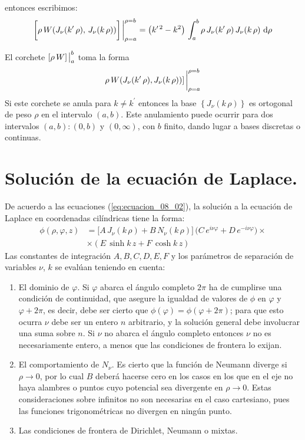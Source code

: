 entonces escribimos:
\begin{align}
\bigg[ \rho \, W(J_{\nu}(\ptilde{k} \, \rho), \, J_{\nu} (k \, \rho)) \bigg]\eval_{\rho=a}^{\rho=b} = \big( k^{\prime \, 2} - k^{2} \big) \, \int_{a}^{b} \rho \, J_{\nu}(\ptilde{k} \, \rho) \, J_{\nu} (k \, \rho) \, \dd{\rho}
\label{eq:ecuacion_08_12}
\end{align}

El corchete $[\rho \, W]\eval_{a}^{b}$ toma la forma
\begin{align*}
\rho \, W(J_{\nu}(k^{\prime} \, \rho), J_{\nu} (k \, \rho))]\eval_{\rho=a}^{\rho=b}
\end{align*}
Si este corchete se anula para $k \neq k^{\prime}$ entonces la base $\left\{ J_{\nu} (k \, \rho) \right\}$ es ortogonal de peso $\rho$ en el intervalo $(a,b)$. Este anulamiento puede ocurrir para dos intervalos $(a,b): (0, b)$ y $(0, \infty)$, con $b$ finito, dando lugar a bases discretas o continuas.
\section{Solución de la ecuación de Laplace.}
De acuerdo a las ecuaciones (\ref{eq:ecuacion_08_02}), la solución a la ecuación de Laplace en coordenadas cilíndricas tiene la forma:
\begin{align*}
\phi (\rho, \varphi, z) &= \big[ A \, J_{\nu} (k \, \rho) + B \, N_{\nu} (k \, \rho) \big] \, (C \, e^{i \nu \varphi} + D \, e^{-i \nu \varphi} \big) \times \\[0.5em]
&\times (E \, \sinh k \, z + F \,  \cosh k \, z)  \end{align*}
Las constantes de integración $A, B, C, D, E, F$ y los parámetros de separación de variables $\nu$, $k$ se evalúan teniendo en cuenta:
\begin{enumerate}[label=\textbf{\Alph*})]
\item El dominio de $\varphi$. Si $\varphi$ abarca el ángulo completo $2 \pi$ ha de cumplirse una condición de continuidad, que asegure la igualdad de valores de $\phi$ en $\varphi$ y $\varphi + 2 \pi$, es decir, debe ser cierto que $\phi (\varphi) = \phi (\varphi + 2 \pi)$; para que esto ocurra $\nu$ debe ser un entero $n$ arbitrario, y la solución general debe involucrar una suma sobre $n$. Si $\nu$ no abarca el ángulo completo entonces $\nu$ no es necesariamente entero, a menos que las condiciones de frontera lo exijan.
\item El comportamiento de $N_{\nu}$. Es cierto que la función de Neumann diverge si $\rho \to 0$, por lo cual $B$ deberá hacerse cero en los casos en los que en el eje no haya alambres o puntos cuyo potencial sea divergente en $\rho \to 0$. Estas consideraciones sobre infinitos no son necesarias en el caso cartesiano, pues las funciones trigonométricas no divergen en ningún punto.
\item Las condiciones de frontera de Dirichlet, Neumann o mixtas.
\end{enumerate}

